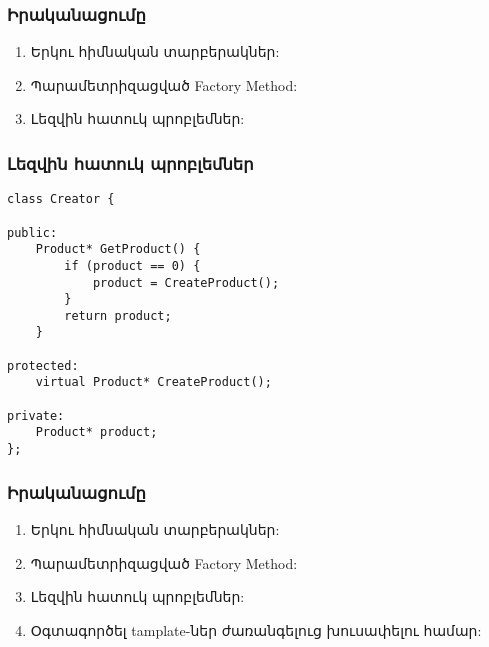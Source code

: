 \documentclass{beamer}
\begin{document}
\begin{frame}\frametitle{Իրականացումը}
\begin{enumerate}
    \item Երկու հիմնական տարբերակներ: \vspace{0.5cm}
    \item Պարամետրիզացված Factory Method: \vspace{0.5cm}
    \item Լեզվին հատուկ պրոբլեմներ: \vfill
\end{enumerate}
\end{frame}

\begin{frame}[fragile]\frametitle{Լեզվին հատուկ պրոբլեմներ}
\begin{english}
\begin{verbatim}
class Creator {

public:
    Product* GetProduct() {
        if (product == 0) {
            product = CreateProduct();
        }
        return product;
    }

protected:
    virtual Product* CreateProduct();

private:
    Product* product;
};
\end{verbatim}
\end{english}
\end{frame}

\begin{frame}\frametitle{Իրականացումը}
\begin{enumerate}
    \item Երկու հիմնական տարբերակներ: \vspace{0.5cm}
    \item Պարամետրիզացված Factory Method: \vspace{0.5cm}
    \item Լեզվին հատուկ պրոբլեմներ: \vspace{0.5cm}
    \item Օգտագործել tamplate-ներ ժառանգելուց խուսափելու համար: \vfill
\end{enumerate}
\end{frame}
\end{document}
